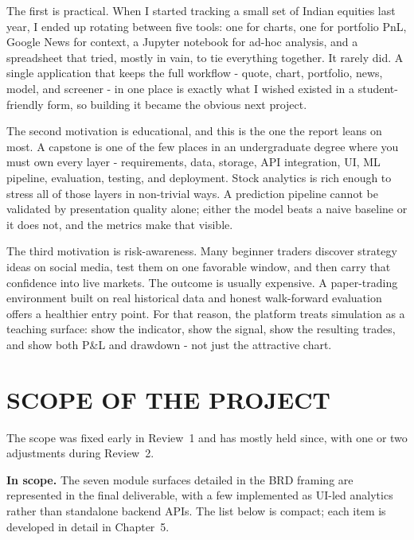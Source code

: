 \documentclass[12pt,a4paper]{report}
\numberwithin{equation}{chapter}
\begin{document}
The first is practical. When I started tracking a small set of Indian equities last year, I ended up rotating between five tools: one for charts, one for portfolio PnL, Google News for context, a Jupyter notebook for ad-hoc analysis, and a spreadsheet that tried, mostly in vain, to tie everything together. It rarely did. A single application that keeps the full workflow - quote, chart, portfolio, news, model, and screener - in one place is exactly what I wished existed in a student-friendly form, so building it became the obvious next project.

The second motivation is educational, and this is the one the report leans on most. A capstone is one of the few places in an undergraduate degree where you must own every layer - requirements, data, storage, API integration, UI, ML pipeline, evaluation, testing, and deployment. Stock analytics is rich enough to stress all of those layers in non-trivial ways. A prediction pipeline cannot be validated by presentation quality alone; either the model beats a naive baseline or it does not, and the metrics make that visible.

The third motivation is risk-awareness. Many beginner traders discover strategy ideas on social media, test them on one favorable window, and then carry that confidence into live markets. The outcome is usually expensive. A paper-trading environment built on real historical data and honest walk-forward evaluation offers a healthier entry point. For that reason, the platform treats simulation as a teaching surface: show the indicator, show the signal, show the resulting trades, and show both P\&L and drawdown - not just the attractive chart.

\section{SCOPE OF THE PROJECT}

The scope was fixed early in Review~1 and has mostly held since, with one or two adjustments during Review~2.

\textbf{In scope.} The seven module surfaces detailed in the BRD framing are represented in the final deliverable, with a few implemented as UI-led analytics rather than standalone backend APIs. The list below is compact; each item is developed in detail in Chapter~5.
\end{document}
